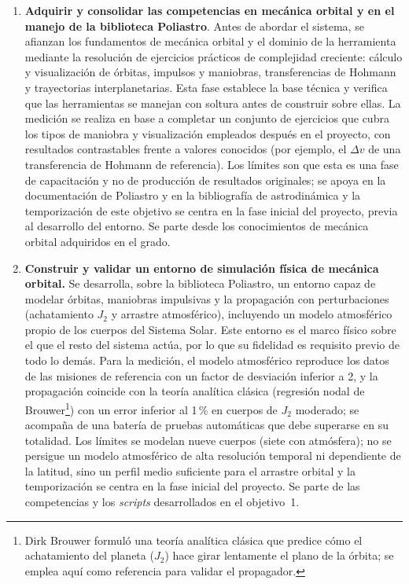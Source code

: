 \begin{enumerate}

  \item \textbf{Adquirir y consolidar las competencias en mecánica orbital y en el manejo de la biblioteca Poliastro}. Antes de abordar el sistema, se afianzan los fundamentos de mecánica orbital y el dominio de la herramienta mediante la resolución de ejercicios prácticos de complejidad creciente: cálculo y visualización de órbitas, impulsos y maniobras, transferencias de Hohmann y trayectorias interplanetarias. Esta fase establece la base técnica y verifica que las herramientas se manejan con soltura antes de construir sobre ellas. La medición se realiza en base a completar un conjunto de ejercicios que cubra los tipos de maniobra y visualización empleados después en el proyecto, con resultados contrastables frente a valores conocidos (por ejemplo, el $\Delta v$ de una transferencia de Hohmann de referencia). Los límites son que esta es una fase de capacitación y no de producción de resultados originales; se apoya en la documentación de Poliastro y en la bibliografía de astrodinámica y la temporización de este objetivo se centra en la fase inicial del proyecto, previa al desarrollo del entorno. Se parte desde los conocimientos de mecánica orbital adquiridos en el grado.

  \item \textbf{Construir y validar un entorno de simulación física de mecánica orbital.} Se desarrolla, sobre la biblioteca Poliastro, un entorno capaz de modelar órbitas, maniobras impulsivas y la propagación con perturbaciones (achatamiento $J_2$ y arrastre atmosférico), incluyendo un modelo atmosférico propio de los cuerpos del Sistema Solar. Este entorno es el marco físico sobre el que el resto del sistema actúa, por lo que su fidelidad es requisito previo de todo lo demás. Para la medición, el modelo atmosférico reproduce los datos de las misiones de referencia con un factor de desviación inferior a 2, y la propagación coincide con la teoría analítica clásica (regresión nodal de Brouwer\footnote{Dirk Brouwer formuló una teoría analítica clásica que predice cómo el achatamiento del planeta ($J_2$) hace girar lentamente el plano de la órbita; se emplea aquí como referencia para validar el propagador.}) con un error inferior al 1\,\% en cuerpos de $J_2$ moderado; se acompaña de una batería de pruebas automáticas que debe superarse en su totalidad. Los límites se modelan nueve cuerpos (siete con atmósfera); no se persigue un modelo atmosférico de alta resolución temporal ni dependiente de la latitud, sino un perfil medio suficiente para el arrastre orbital y la temporización se centra en la fase inicial del proyecto. Se parte de las competencias y los \textit{scripts}
  desarrollados en el objetivo~1.


\end{enumerate}
